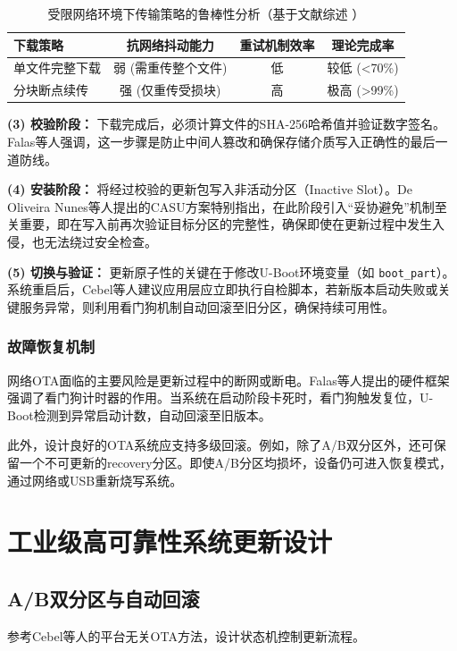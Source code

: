 \documentclass[a4paper,12pt]{article}
\begin{document}
\begin{table}[H]
\centering
\caption{受限网络环境下传输策略的鲁棒性分析（基于文献综述 \cite{Mirani2022, Shen2007}）}
\label{tab:ota_download}
\begin{tabular}{lccc}
\toprule
\textbf{下载策略} & \textbf{抗网络抖动能力} & \textbf{重试机制效率} & \textbf{理论完成率} \\
\midrule
单文件完整下载 & 弱 (需重传整个文件) & 低 & 较低 (<70\%) \\
分块断点续传 & 强 (仅重传受损块) & 高 & 极高 (>99\%) \\
\bottomrule
\end{tabular}
\end{table}

\textbf{(3) 校验阶段：} 
下载完成后，必须计算文件的SHA-256哈希值并验证数字签名。Falas等人强调，这一步骤是防止中间人篡改和确保存储介质写入正确性的最后一道防线\cite{Falas2019}。

\textbf{(4) 安装阶段：} 
将经过校验的更新包写入非活动分区（Inactive Slot）。De Oliveira Nunes等人提出的CASU方案特别指出，在此阶段引入“妥协避免”机制至关重要，即在写入前再次验证目标分区的完整性，确保即使在更新过程中发生入侵，也无法绕过安全检查\cite{DeOliveiraNunes2022}。

\textbf{(5) 切换与验证：} 
更新原子性的关键在于修改U-Boot环境变量（如 \texttt{boot\_part}）。系统重启后，Cebel等人建议应用层应立即执行自检脚本，若新版本启动失败或关键服务异常，则利用看门狗机制自动回滚至旧分区，确保持续可用性\cite{Cebel2022}。

\subsubsection{故障恢复机制}
网络OTA面临的主要风险是更新过程中的断网或断电。Falas等人提出的硬件框架强调了看门狗计时器的作用\cite{Falas2019}。当系统在启动阶段卡死时，看门狗触发复位，U-Boot检测到异常启动计数，自动回滚至旧版本。

此外，设计良好的OTA系统应支持多级回滚。例如，除了A/B双分区外，还可保留一个不可更新的recovery分区。即使A/B分区均损坏，设备仍可进入恢复模式，通过网络或USB重新烧写系统。

\newpage
\section{工业级高可靠性系统更新设计}

\subsection{A/B双分区与自动回滚}
参考Cebel等人的平台无关OTA方法\cite{Cebel2022}，设计状态机控制更新流程。
\end{document}
